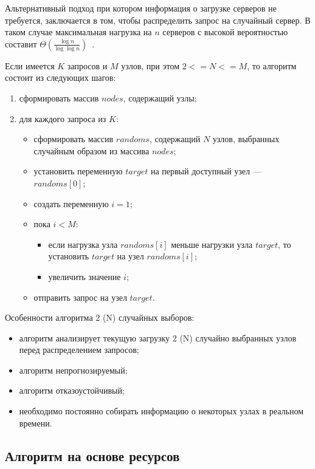 Альтернативный подход при котором информация о загрузке серверов не требуется, заключается в том, чтобы распределить запрос на случайный сервер.
В таком случае максимальная нагрузка на $n$ серверов с высокой вероятностью составит $\Theta(\frac{\log n }{\log \log n})$~\cite{pwr2choices}.

Если имеется $K$ запросов и $M$ узлов, при этом $2 <= N <= M$, то алгоритм состоит из следующих шагов:

\begin{enumerate}
	\item сформировать массив $nodes$, содержащий узлы;
	\item для каждого запроса из $K$:
	\begin{itemize}
		\item сформировать массив $randoms$, содержащий $N$ узлов, выбранных случайным образом из массива $nodes$;
		\item установить переменную $target$ на первый доступный узел --- $randoms[0]$;
		\item создать переменную $i = 1$;
		\item пока $i < M$:
		\begin{itemize}
			\item если нагрузка узла $randoms[i]$ меньше нагрузки узла $target$, то установить $target$ на узел $randoms[i]$;
			\item увеличить значение $i$;
		\end{itemize}
		\item отправить запрос на узел $target$.
	\end{itemize}
\end{enumerate}

Особенности алгоритма 2 (N) случайных выборов:
\begin{itemize}
    \item алгоритм анализирует текущую загрузку 2 (N) случайно выбранных узлов перед распределением запросов;
    \item алгоритм непрогнозируемый;
    \item алгоритм отказоустойчивый; 
    \item необходимо постоянно собирать информацию о некоторых узлах в реальном времени.
\end{itemize}

\subsection{Алгоритм на основе ресурсов}

